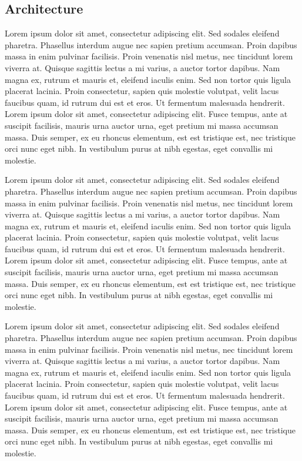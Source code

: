 \subsection{Architecture}
Lorem ipsum dolor sit amet, consectetur adipiscing elit. Sed sodales
eleifend pharetra. Phasellus interdum augue nec sapien pretium accumsan.
Proin dapibus massa in enim pulvinar facilisis. Proin venenatis nisl metus,
nec tincidunt lorem viverra at. Quisque sagittis lectus a mi varius, a
auctor tortor dapibus. Nam magna ex, rutrum et mauris et, eleifend iaculis
enim. Sed non tortor quis ligula placerat lacinia. Proin consectetur, sapien
quis molestie volutpat, velit lacus faucibus quam, id rutrum dui est et
eros. Ut fermentum malesuada hendrerit. Lorem ipsum dolor sit amet,
consectetur adipiscing elit. Fusce tempus, ante at suscipit facilisis,
mauris urna auctor urna, eget pretium mi massa accumsan massa. Duis semper,
ex eu rhoncus elementum, est est tristique est, nec tristique orci nunc eget
nibh. In vestibulum purus at nibh egestas, eget convallis mi molestie.

Lorem ipsum dolor sit amet, consectetur adipiscing elit. Sed sodales
eleifend pharetra. Phasellus interdum augue nec sapien pretium accumsan.
Proin dapibus massa in enim pulvinar facilisis. Proin venenatis nisl metus,
nec tincidunt lorem viverra at. Quisque sagittis lectus a mi varius, a
auctor tortor dapibus. Nam magna ex, rutrum et mauris et, eleifend iaculis
enim. Sed non tortor quis ligula placerat lacinia. Proin consectetur, sapien
quis molestie volutpat, velit lacus faucibus quam, id rutrum dui est et
eros. Ut fermentum malesuada hendrerit. Lorem ipsum dolor sit amet,
consectetur adipiscing elit. Fusce tempus, ante at suscipit facilisis,
mauris urna auctor urna, eget pretium mi massa accumsan massa. Duis semper,
ex eu rhoncus elementum, est est tristique est, nec tristique orci nunc eget
nibh. In vestibulum purus at nibh egestas, eget convallis mi molestie.

Lorem ipsum dolor sit amet, consectetur adipiscing elit. Sed sodales
eleifend pharetra. Phasellus interdum augue nec sapien pretium accumsan.
Proin dapibus massa in enim pulvinar facilisis. Proin venenatis nisl metus,
nec tincidunt lorem viverra at. Quisque sagittis lectus a mi varius, a
auctor tortor dapibus. Nam magna ex, rutrum et mauris et, eleifend iaculis
enim. Sed non tortor quis ligula placerat lacinia. Proin consectetur, sapien
quis molestie volutpat, velit lacus faucibus quam, id rutrum dui est et
eros. Ut fermentum malesuada hendrerit. Lorem ipsum dolor sit amet,
consectetur adipiscing elit. Fusce tempus, ante at suscipit facilisis,
mauris urna auctor urna, eget pretium mi massa accumsan massa. Duis semper,
ex eu rhoncus elementum, est est tristique est, nec tristique orci nunc eget
nibh. In vestibulum purus at nibh egestas, eget convallis mi molestie.

